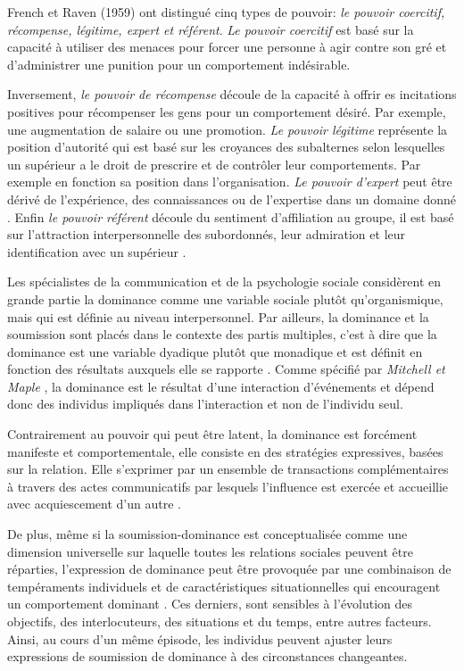 		French et Raven (1959) ont distingué cinq types de pouvoir: \textit{le pouvoir coercitif, récompense, légitime, expert et référent}. 
		\textit{Le pouvoir coercitif} est basé sur la capacité à utiliser des menaces pour forcer une personne à agir contre son gré et d'administrer une punition pour un comportement indésirable.
		
		Inversement, \textit{le pouvoir de récompense} découle de la capacité à offrir es incitations positives pour récompenser les gens pour un comportement désiré. Par exemple, une augmentation de salaire ou une promotion.
		\textit{Le pouvoir légitime} représente la position d'autorité qui est basé sur les croyances des subalternes selon lesquelles un supérieur a le droit de prescrire et de contrôler leur comportements. Par exemple en fonction sa position dans l'organisation. 
		\textit{Le pouvoir d'expert} peut être dérivé de l'expérience, des connaissances ou de l'expertise dans un domaine donné \cite{van2006power}. 
		Enfin \textit{le pouvoir référent} découle du sentiment d'affiliation au groupe, il est basé sur l'attraction interpersonnelle des subordonnés, leur admiration et leur identification avec un supérieur \cite{van2006power}.
	
		Les spécialistes de la communication et de la psychologie sociale considèrent en grande partie la dominance comme une variable sociale plutôt qu'organismique, mais qui est définie au niveau interpersonnel. Par ailleurs, la dominance et la soumission sont placés dans le contexte des partis multiples, c'est à dire que la dominance est une variable dyadique plutôt que monadique et est définit en fonction des résultats auxquels elle se rapporte  \cite{burgoon1998nature,burgoon2006nonverbal}.
		Comme spécifié par \emph{Mitchell et Maple} \cite{smither1993authoritarianism}, la dominance est le résultat d'une interaction d'événements et dépend donc des individus impliqués dans l'interaction et non de l'individu seul.
		
	 	Contrairement au pouvoir qui peut être latent, la dominance est forcément manifeste et comportementale, elle consiste en des stratégies expressives, basées sur la relation. Elle s'exprimer par un ensemble de transactions complémentaires à travers des actes communicatifs par lesquels l'influence est exercée et accueillie avec acquiescement d'un autre \cite{burgoon2000interactionist,millar1987relational}. 
		
		De plus, même si la soumission-dominance est conceptualisée comme une dimension universelle sur laquelle toutes les relations sociales peuvent être réparties, l'expression de dominance peut être provoquée par une combinaison de tempéraments individuels et de caractéristiques situationnelles	qui encouragent un comportement dominant \cite{burgoon2000interactionist}. Ces derniers, sont sensibles à l'évolution des objectifs, des interlocuteurs, des situations et du temps, entre autres facteurs.
		Ainsi, au cours d'un même épisode, les individus peuvent ajuster leurs expressions de soumission de dominance à des circonstances changeantes.
		
